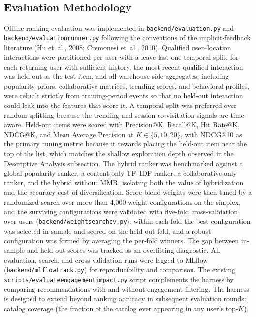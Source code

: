 \documentclass[12pt,letterpaper]{article}
\newcommand{\codeunderscore}{\discretionary{\textunderscore}{}{\textunderscore}}
\newcommand{\code}[1]{\begingroup\let\_\codeunderscore\texttt{\small #1}\endgroup}
\begin{document}
\subsection{Evaluation Methodology}\label{sec:eval}

Offline ranking evaluation was implemented in
\code{backend/evaluation.py} and \code{backend/evaluation\_runner.py}
following the conventions of the implicit-feedback literature (Hu
et~al., 2008; Cremonesi et~al., 2010). Qualified user--location
interactions were partitioned per user with a leave-last-one temporal
split: for each returning user with sufficient history, the most
recent qualified interaction was held out as the test item, and all
warehouse-side aggregates, including popularity priors, collaborative
matrices, trending scores, and behavioral profiles, were rebuilt
strictly from training-period events so that no held-out interaction
could leak into the features that score it. A temporal split was
preferred over random splitting because the trending and
session-co-visitation signals are time-aware. Held-out items were
scored with Precision@K, Recall@K, Hit Rate@K, NDCG@K, and Mean
Average Precision at $K \in \{5, 10, 20\}$, with NDCG@10 as the
primary tuning metric because it rewards placing the held-out item
near the top of the list, which matches the shallow exploration depth
observed in the Descriptive Analysis subsection. The hybrid ranker was
benchmarked against a global-popularity ranker, a content-only
TF--IDF ranker, a collaborative-only ranker, and the hybrid without
MMR, isolating both the value of hybridization and the accuracy cost
of diversification. Score-blend weights were then tuned by a
randomized search over more than 4{,}000 weight configurations on the
simplex, and the surviving configurations were validated with
five-fold cross-validation over users
(\code{backend/weight\_search\_cv.py}): within each fold the best
configuration was selected in-sample and scored on the held-out fold,
and a robust configuration was formed by averaging the per-fold
winners. The gap between in-sample and held-out scores was tracked as
an overfitting diagnostic. All evaluation, search, and
cross-validation runs were logged to MLflow
(\code{backend/mlflow\_track.py}) for reproducibility and comparison.
The existing \code{scripts/evaluate\_engagement\_impact.py} script
complements the harness by comparing recommendations with and without
engagement filtering. The harness is designed to extend beyond
ranking accuracy in subsequent evaluation rounds: catalog coverage
(the fraction of the catalog ever appearing in any user's top-$K$),
\end{document}
